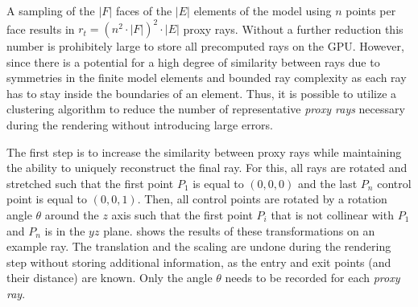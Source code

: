 A sampling of the $|F|$ faces of the $|E|$ elements of the model using $n$ points per face results in $r_t = \left( n^2 \cdot |F| \right) ^2 \cdot |E|$ proxy rays.  Without a further reduction this number is prohibitely large to store all precomputed rays on the GPU.  However, since there is a potential for a high degree of similarity between rays due to symmetries in the finite model elements and bounded ray complexity as each ray has to stay inside the boundaries of an element.  Thus, it is possible to utilize a clustering algorithm to reduce the number of representative \emph{proxy rays} necessary during the rendering without introducing large errors.


The first step is to increase the similarity between proxy rays while maintaining the ability to uniquely reconstruct the final ray.  For this, all rays are rotated and stretched such that the first point $P_1$ is equal to $(0,0,0)$ and the last $P_n$ control point is equal to $(0,0,1)$.  Then, all control points are rotated by a rotation angle $\theta$ around the $z$ axis such that the first point $P_i$ that is not collinear with $P_1$ and $P_n$ is in the $yz$ plane.   shows the results of these transformations on an example ray.  The translation and the scaling are undone during the rendering step without storing additional information, as the entry and exit points (and their distance) are known.  Only the angle $\theta$ needs to be recorded for each \emph{proxy ray}.

